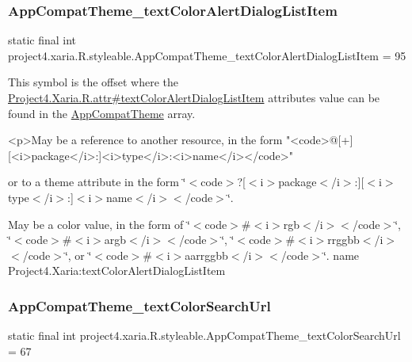 \subsubsection{\texorpdfstring{App\+Compat\+Theme\+\_\+text\+Color\+Alert\+Dialog\+List\+Item}{AppCompatTheme\_textColorAlertDialogListItem}}
{\footnotesize\ttfamily static final int project4.\+xaria.\+R.\+styleable.\+App\+Compat\+Theme\+\_\+text\+Color\+Alert\+Dialog\+List\+Item = 95\hspace{0.3cm}{\ttfamily [static]}}

This symbol is the offset where the \hyperlink{}{Project4.\+Xaria.\+R.\+attr\#text\+Color\+Alert\+Dialog\+List\+Item} attribute\textquotesingle{}s value can be found in the \hyperlink{classproject4_1_1xaria_1_1R_1_1styleable_aad8bec413e2350f9404e6ff0e831a85d}{App\+Compat\+Theme} array.

\begin{DoxyVerb}      <p>May be a reference to another resource, in the form "<code>@[+][<i>package</i>:]<i>type</i>:<i>name</i></code>"
\end{DoxyVerb}
 or to a theme attribute in the form \char`\"{}$<$code$>$?\mbox{[}$<$i$>$package$<$/i$>$\+:\mbox{]}\mbox{[}$<$i$>$type$<$/i$>$\+:\mbox{]}$<$i$>$name$<$/i$>$$<$/code$>$\char`\"{}. 

May be a color value, in the form of \char`\"{}$<$code$>$\#$<$i$>$rgb$<$/i$>$$<$/code$>$\char`\"{}, \char`\"{}$<$code$>$\#$<$i$>$argb$<$/i$>$$<$/code$>$\char`\"{}, \char`\"{}$<$code$>$\#$<$i$>$rrggbb$<$/i$>$$<$/code$>$\char`\"{}, or \char`\"{}$<$code$>$\#$<$i$>$aarrggbb$<$/i$>$$<$/code$>$\char`\"{}.  name Project4.\+Xaria\+:text\+Color\+Alert\+Dialog\+List\+Item \mbox{\label{classproject4_1_1xaria_1_1R_1_1styleable_aabbc8b91c6cabb8ea2973b309f65c63c}} 
\subsubsection{\texorpdfstring{App\+Compat\+Theme\+\_\+text\+Color\+Search\+Url}{AppCompatTheme\_textColorSearchUrl}}
{\footnotesize\ttfamily static final int project4.\+xaria.\+R.\+styleable.\+App\+Compat\+Theme\+\_\+text\+Color\+Search\+Url = 67\hspace{0.3cm}{\ttfamily [static]}}

